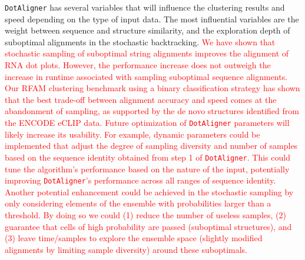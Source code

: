 \documentclass{bmcart}
\newcommand\dotaligner{\texttt{DotAligner}}
\begin{document}
\dotaligner{} has several variables that will influence the clustering results and 
speed depending on the type of input data. The most influential variables are 
the weight between sequence and structure similarity, and the exploration 
depth of suboptimal alignments in the stochastic backtracking.
\textcolor{red} {
We have shown that stochastic sampling of suboptimal string alignments improves
the alignment of RNA dot plots. However, the performance increase does not outweigh
the increase in runtime associated with sampling suboptimal sequence alignments.
Our RFAM clustering benchmark using a binary classification strategy has shown that 
the best trade-off between alignment accuracy and speed comes at the abandonment of sampling,
as supported by the de novo structures identified from the ENCODE eCLIP data.  
Future optimization of \dotaligner{} parameters will likely increase its usability. For example,   
dynamic parameters could be implemented that adjust the degree of sampling diversity
and number of samples based on the sequence identity obtained from step 1 of \dotaligner{}. 
This could tune the algorithm's performance based on the nature of the input, 
potentially improving \dotaligner{}'s performance across all ranges of sequence identity. 
Another potential enhancement could be achieved in the stochastic sampling by only 
considering elements of the ensemble with probabilities larger than a threshold. 
By doing so we could (1) reduce the number of useless
samples, (2) guarantee that cells of high probability are passed (suboptimal
structures), and (3) leave time/samples to explore the ensemble space (slightly
modified alignments by limiting sample diversity) around these suboptimals.}
\\
\end{document}
